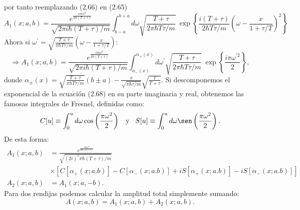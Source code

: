 por tanto reemplazando (2.66) en (2.65)
\begin{equation}
A_{1}(x;a,b)=\frac{e^{\frac{imx^{2}}{2\hbar(T+\tau)}}}{\sqrt{2\pi i\hbar(T+\tau)/m}}\int_{b-a}^{b+a}d\omega\sqrt{\frac{T+\tau}{2\pi\hbar T\tau/m}}\ \exp\left\{ \frac{i(T+\tau)}{2\hbar T\tau/m}\left(\omega-\frac{x}{1+\tau/T}\right)^{2}\right\}
\end{equation}
Ahora si $\omega^{\prime}=\sqrt{\frac{T+\tau}{\pi\hbar T\tau/m}}\left(\omega-\frac{x}{1+\tau/T}\right)$:
\begin{equation}
\Rightarrow A_{1}(x;a,b)=\frac{e^{\frac{imx^{2}}{2\hbar(T+\tau)}}}{\sqrt{2\pi i\hbar(T+\tau)/m}}\int_{\alpha_{-}(x)}^{\alpha_{+}(x)}d\omega^{\prime}\sqrt{\frac{T+\tau}{2\pi\hbar T\tau/m}}\ \exp\left\{ \frac{i\pi\omega^{\prime 2}}{2}\right\} ,
\end{equation}
donde $\alpha_{\pm}(x)=\sqrt{\frac{T+\tau}{\pi\hbar T\tau/m}}(b\pm a)-\frac{x}{\sqrt{\pi\hbar\tau/m}}\sqrt{\frac{T}{T+\tau}}$.
Si descomponemos el exponencial de la ecuación (2.68) en su parte imaginaria y real, obtenemos las famosas integrales de Fresnel, definidas como:
\begin{equation}
C[u]\equiv \int_{0}^{u}d\omega \cos\left(\frac{\pi\omega ^2 }{2}\right)\hspace{0.3cm} \text{y}\hspace{0.3cm} S[u]\equiv \int_{0}^{u}d\omega \sen\left(\frac{\pi\omega ^2 }{2}\right) .
\end{equation}
De esta forma:
\begin{align}
\nonumber A_{1}(x;a,b)&=\frac{e^{\frac{imx^{2}}{2\hbar(T+\tau)}}}{\sqrt{(2i)^{2}\pi\hbar(T+\tau)/m}}\\
&\times[C[\alpha_{+}(x;a.b)]-C[\alpha_{-}(x;a.b)]+iS[\alpha_{+}(x;a.b)]-iS[\alpha_{-}(x;a.b)]]\\
A_{2}(x;a,b)&=A_{1}(x;a,-b).
\end{align}
Para dos rendijas podemos calcular la amplitud total simplemente sumando:
\begin{equation}
A(x;a,b)=A_{1}(x;a,b)+A_{2}(x;a,b).
\end{equation}


